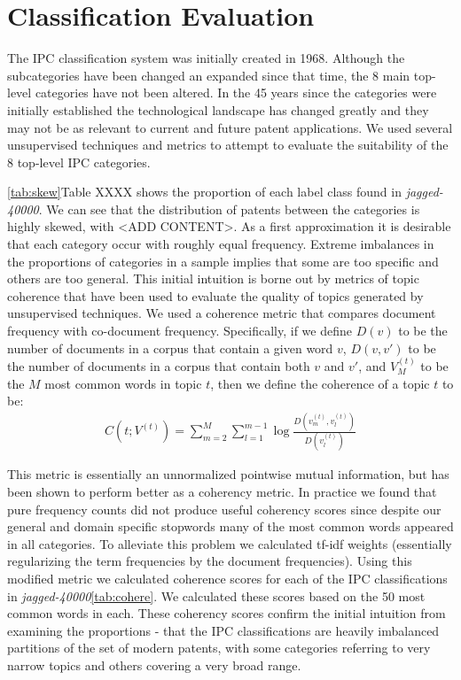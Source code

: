 \section{Classification Evaluation} %
\label{sec:classification_evaluation}

The IPC classification system was initially created in 1968. Although the subcategories have been changed an expanded since that time, the 8 main top-level categories have not been altered. In the 45 years since the categories were initially established the technological landscape has changed greatly and they may not be as relevant to current and future patent applications. We used several unsupervised techniques and metrics to attempt to evaluate the suitability of the 8 top-level IPC categories.

\ref{tab:skew}Table XXXX shows the proportion of each label class found in \emph{jagged-40000}. We can see that the distribution of patents between the categories is highly skewed, with <ADD CONTENT>. As a first approximation it is desirable that each category occur with roughly equal frequency. Extreme imbalances in the proportions of categories in a sample implies that some are too specific and others are too general. This initial intuition is borne out by metrics of topic coherence that have been used to evaluate the quality of topics generated by unsupervised techniques. We used a coherence metric that compares document frequency with co-document frequency\cite{Mimno_optimizingsemantic}. Specifically, if we define $D(v)$ to be the number of documents in a corpus that contain a given word $v$, $D(v, v')$ to be the number of documents in a corpus that contain both $v$ and $v'$, and $V^{(t)}_M$ to be the $M$ most common words in topic $t$, then we define the coherence of a topic $t$ to be:
\begin{align*}
	C(t;V^{(t)}) = \sum_{m=2}^M \sum_{l=1}^{m-1} \log \frac{D(v^{(t)}_m, v^{(t)}_l)}{D(v^{(t)}_l)}
\end{align*}

This metric is essentially an unnormalized pointwise mutual information, but has been shown to perform better as a coherency metric\cite{Mimno_optimizingsemantic}. In practice we found that pure frequency counts did not produce useful coherency scores since despite our general and domain specific stopwords many of the most common words appeared in all categories. To alleviate this problem we calculated tf-idf weights (essentially regularizing the term frequencies by the document frequencies). Using this modified metric we calculated coherence scores for each of the IPC classifications in \emph{jagged-40000}\ref{tab:cohere}. We calculated these scores based on the 50 most common words in each. These coherency scores confirm the initial intuition from examining the proportions - that the IPC classifications are heavily imbalanced partitions of the set of modern patents, with some categories referring to very narrow topics and others covering a very broad range.

